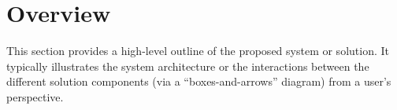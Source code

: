 \section{Overview}\label{s:overview}

This section provides a high-level outline of the proposed system or solution.
It typically illustrates the system architecture or the interactions between the
different solution components (via a “boxes-and-arrows” diagram) from a user’s
perspective.

\textcolor{lightgray}{\lipsum[14-24]}


